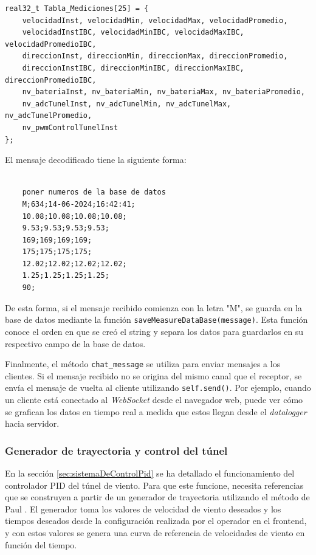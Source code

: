 \begin{lstlisting}[style=cstyle, caption={Estructura del mensaje enviado por el \textit{datalogger}}, label=cdg:estructuraMensaje, basicstyle=\ttfamily\fontsize{8}{8}\selectfont]
real32_t Tabla_Mediciones[25] = {
    velocidadInst, velocidadMin, velocidadMax, velocidadPromedio,
    velocidadInstIBC, velocidadMinIBC, velocidadMaxIBC, velocidadPromedioIBC,
    direccionInst, direccionMin, direccionMax, direccionPromedio,
    direccionInstIBC, direccionMinIBC, direccionMaxIBC, direccionPromedioIBC,
    nv_bateriaInst, nv_bateriaMin, nv_bateriaMax, nv_bateriaPromedio,
    nv_adcTunelInst, nv_adcTunelMin, nv_adcTunelMax, nv_adcTunelPromedio,
    nv_pwmControlTunelInst
};
\end{lstlisting}

El mensaje decodificado tiene la siguiente forma:
\begin{verbatim}
    
    poner numeros de la base de datos
    M;634;14-06-2024;16:42:41;
    10.08;10.08;10.08;10.08;
    9.53;9.53;9.53;9.53;
    169;169;169;169;
    175;175;175;175;
    12.02;12.02;12.02;12.02;
    1.25;1.25;1.25;1.25;
    90;
\end{verbatim}

De esta forma, si el mensaje recibido comienza con la letra "M", se guarda en la base de datos mediante la función \texttt{saveMeasureDataBase(message)}. Esta función conoce el orden en que se creó el string y separa los datos para guardarlos en su respectivo campo de la base de datos.

Finalmente, el método \texttt{chat\_message} se utiliza para enviar mensajes a los clientes. Si el mensaje recibido no se origina del mismo canal que el receptor, se envía el mensaje de vuelta al cliente utilizando \texttt{self.send()}. Por ejemplo, cuando un cliente está conectado al \textit{WebSocket} desde el navegador web, puede ver cómo se grafican los datos en tiempo real a medida que estos llegan desde el \textit{datalogger} hacia servidor.


\subsubsection{Generador de trayectoria y control del túnel}\label{sec:genTrayec}

En la sección \ref{sec:sistemaDeControlPid} se ha detallado el funcionamiento del controlador PID del túnel de viento. Para que este funcione, necesita referencias que se construyen a partir de un generador de trayectoria utilizando el método de Paul \cite{RoboFIUBAGenTrayec}. El generador toma los valores de velocidad de viento deseados y los tiempos deseados desde la configuración realizada por el operador en el frontend, y con estos valores se genera una curva de referencia de velocidades de viento en función del tiempo.

